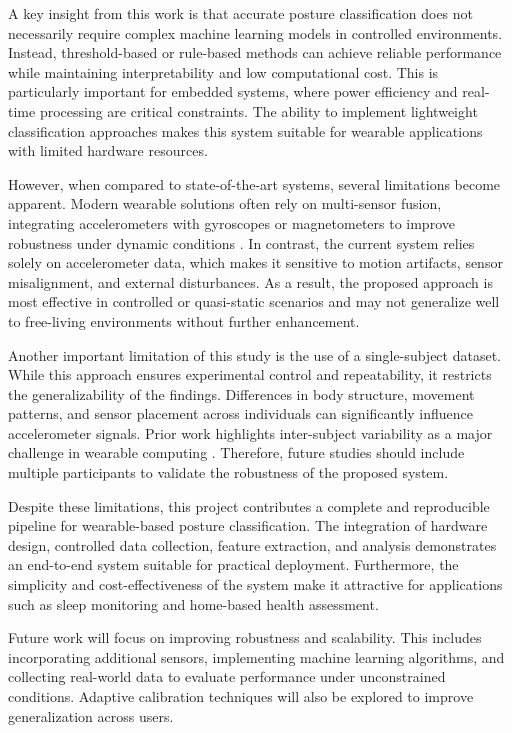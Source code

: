 \documentclass[journal]{IEEEtran}
\begin{document}
A key insight from this work is that accurate posture classification does not necessarily require complex machine learning models in controlled environments. Instead, threshold-based or rule-based methods can achieve reliable performance while maintaining interpretability and low computational cost. This is particularly important for embedded systems, where power efficiency and real-time processing are critical constraints. The ability to implement lightweight classification approaches makes this system suitable for wearable applications with limited hardware resources.

However, when compared to state-of-the-art systems, several limitations become apparent. Modern wearable solutions often rely on multi-sensor fusion, integrating accelerometers with gyroscopes or magnetometers to improve robustness under dynamic conditions \cite{ref3}. In contrast, the current system relies solely on accelerometer data, which makes it sensitive to motion artifacts, sensor misalignment, and external disturbances. As a result, the proposed approach is most effective in controlled or quasi-static scenarios and may not generalize well to free-living environments without further enhancement.

Another important limitation of this study is the use of a single-subject dataset. While this approach ensures experimental control and repeatability, it restricts the generalizability of the findings. Differences in body structure, movement patterns, and sensor placement across individuals can significantly influence accelerometer signals. Prior work highlights inter-subject variability as a major challenge in wearable computing \cite{ref4}. Therefore, future studies should include multiple participants to validate the robustness of the proposed system.

Despite these limitations, this project contributes a complete and reproducible pipeline for wearable-based posture classification. The integration of hardware design, controlled data collection, feature extraction, and analysis demonstrates an end-to-end system suitable for practical deployment. Furthermore, the simplicity and cost-effectiveness of the system make it attractive for applications such as sleep monitoring and home-based health assessment.

Future work will focus on improving robustness and scalability. This includes incorporating additional sensors, implementing machine learning algorithms, and collecting real-world data to evaluate performance under unconstrained conditions. Adaptive calibration techniques will also be explored to improve generalization across users.
\end{document}
